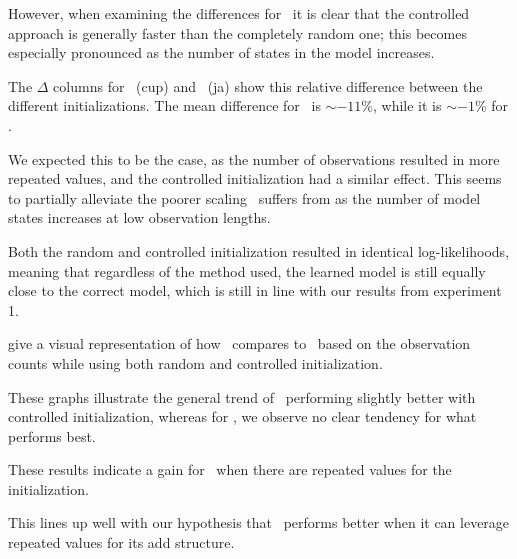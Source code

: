 However, when examining the differences for \Cupaal\, it is clear that the controlled approach is generally faster than the completely random one; this becomes especially pronounced as the number of states in the model increases.

The $\Delta$ columns for \Cupaal\ (cup) and \Jajapy\ (ja) show this relative difference between the different initializations. The mean difference for \Cupaal\ is $\sim-11\%$, while it is $\sim-1\%$ for \Jajapy.

We expected this to be the case, as the number of observations resulted in more repeated values, and the controlled initialization had a similar effect.
This seems to partially alleviate the poorer scaling \Cupaal\ suffers from as the number of model states increases at low observation lengths.

Both the random and controlled initialization resulted in identical log-likelihoods, meaning that regardless of the method used, the learned model is still equally close to the correct model, which is still in line with our results from experiment 1.

 give a visual representation of how \Cupaal\ compares to \Jajapy\ based on the observation counts while using both random and controlled initialization.

These graphs illustrate the general trend of \Cupaal\ performing slightly better with controlled initialization, whereas for \Jajapy, we observe no clear tendency for what performs best.

These results indicate a gain for \Cupaal\ when there are repeated values for the initialization.

This lines up well with our hypothesis that \Cupaal\ performs better when it can leverage repeated values for its \gls{add} structure.